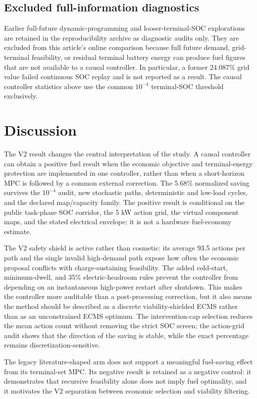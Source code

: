 \documentclass[energies,article,submit,moreauthors]{Definitions/mdpi}
\begin{document}
\subsection{Excluded full-information diagnostics}
Earlier full-future dynamic-programming and looser-terminal-SOC explorations are retained in the reproducibility archive as diagnostic audits only. They are excluded from this article's online comparison because full future demand, grid-terminal feasibility, or residual terminal battery energy can produce fuel figures that are not available to a causal controller. In particular, a former 24.087\% grid value failed continuous SOC replay and is not reported as a result. The causal controller statistics above use the common $10^{-4}$ terminal-SOC threshold exclusively.

\section{Discussion}
The V2 result changes the central interpretation of the study. A causal controller can obtain a positive fuel result when the economic objective and terminal-energy protection are implemented in one controller, rather than when a short-horizon MPC is followed by a common external correction. The 5.68\% normalized saving survives the $10^{-4}$ audit, new stochastic paths, deterministic and low-load cycles, and the declared map/capacity family. The positive result is conditional on the public task-phase SOC corridor, the 5 kW action grid, the virtual component maps, and the stated electrical envelope; it is not a hardware fuel-economy estimate.

The V2 safety shield is active rather than cosmetic: its average 93.5 actions per path and the single invalid high-demand path expose how often the economic proposal conflicts with charge-sustaining feasibility. The added cold-start, minimum-dwell, and 35\% electric-headroom rules prevent the controller from depending on an instantaneous high-power restart after shutdown. This makes the controller more auditable than a post-processing correction, but it also means the method should be described as a discrete viability-shielded ECMS rather than as an unconstrained ECMS optimum. The intervention-cap selection reduces the mean action count without removing the strict SOC screen; the action-grid audit shows that the direction of the saving is stable, while the exact percentage remains discretization-sensitive.

The legacy literature-shaped arm does not support a meaningful fuel-saving effect from its terminal-set MPC. Its negative result is retained as a negative control: it demonstrates that recursive feasibility alone does not imply fuel optimality, and it motivates the V2 separation between economic selection and viability filtering.
\end{document}
